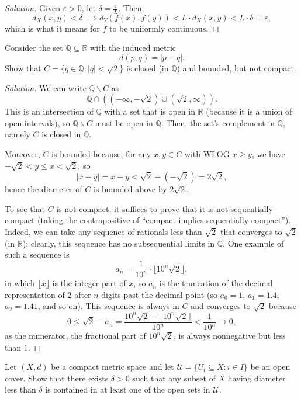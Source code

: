 \documentclass[11pt]{scrartcl}
\providecommand{\eps}{\varepsilon}
\providecommand{\QQ}{\mathbb Q}
\providecommand{\RR}{\mathbb R}
\providecommand{\setdiff}{\smallsetminus}
\newenvironment{soln}{\begin{proof}[Solution]}{\end{proof}}
\begin{document}
\begin{soln}
	Given $\eps > 0$, let $\delta = \frac{\eps}{L}$. Then,
	\[d_X(x,y) < \delta\implies d_Y(f(x),f(y)) <
	L\cdot d_X(x,y) < L\cdot\delta = \eps,\]
	which is what it means for $f$ to be uniformly continuous.
\end{soln}

\begin{problem}
	Consider the set $\QQ\subseteq\RR$ with the induced metric
	\[d(p, q) = |p - q|.\]
	Show that $C = \{q\in\QQ : |q| < \sqrt2\}$
	is closed (in $\QQ$) and bounded, but not compact.
\end{problem}

\begin{soln}
	We can write $\QQ\setdiff C$ as
	\[\QQ\cap((-\infty, -\sqrt2)\cup(\sqrt2,\infty)).\]
	This is an intersection of $\QQ$ with a set that is open in $\RR$
	(because it is a union of open intervals),
	so $\QQ\setdiff C$ must be open in $\QQ$.
	Then, the set's complement in $\QQ$, namely $C$ is closed in $\QQ$.
	
	Moreover, $C$ is bounded because, for any $x,y\in C$
	with WLOG $x \ge y$, we have $-\sqrt 2 < y \le x < \sqrt2$, so
	\[|x - y| = x - y < \sqrt2 - (-\sqrt 2) = 2\sqrt2,\]
	hence the diameter of $C$ is bounded above by $2\sqrt2$.
	
	To see that $C$ is not compact, it suffices to prove that
	it is not sequentially compact (taking the contrapositive of
	``compact implies sequentially compact'').
	Indeed, we can take any sequence of rationals
	less than $\sqrt2$ that converges to $\sqrt 2$ (in $\RR$);
	clearly, this sequence has no subsequential limits in $\QQ$.
	One example of such a sequence is
	\[a_n = \frac{1}{10^n}\cdot\lfloor 10^n\sqrt2\rfloor,\]
	in which $\lfloor x\rfloor$ is the integer part of $x$,
	so $a_n$ is the truncation of the decimal representation of $2$
	after $n$ digits past the decimal point
	(so $a_0 = 1$, $a_1 = 1.4$, $a_2 = 1.41$, and so on).
	This sequence is always in $C$ and converges to $\sqrt 2$
	because
	\[0 \le \sqrt2 - a_n = \frac{10^n\sqrt2 - \lfloor10^n\sqrt2\rfloor}{10^n}
	< \frac{1}{10^n} \to 0,\]
	as the numerator, the fractional part of $10^n\sqrt2$,
	is always nonnegative but less than $1$.
\end{soln}

\begin{problem}
	Let $(X, d)$ be a compact metric space and
	let $\mathcal U = \{U_i\subseteq X : i\in I\}$ be an open cover.
	Show that there exists $\delta > 0$ such that
	any subset of $X$ having diameter less than $\delta$
	is contained in at least one of the open sets in $\mathcal U$.
\end{problem}
\end{document}
